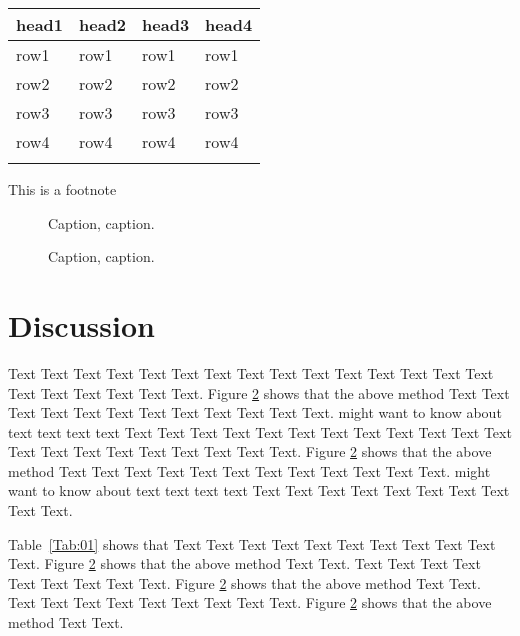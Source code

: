 \documentclass{bioinfo}
\begin{document}
\begin{methods}
\begin{table}[!t]
{\begin{tabular}{llll}\toprule
head1 & head2 & head3 & head4\\\midrule
row1 & row1 & row1 & row1\\
row2 & row2 & row2 & row2\\
row3 & row3 & row3 & row3\\
row4 & row4 & row4 & row4\\\botrule
\end{tabular}}{This is a footnote}
\end{table}

\end{methods}

\begin{figure}[!tpb]%
\caption{Caption, caption.}\label{fig:01}
\end{figure}

\begin{figure}[!tpb]%
\caption{Caption, caption.}\label{fig:02}
\end{figure}

\section{Discussion}

Text Text Text Text Text Text  Text Text Text Text Text Text Text Text Text  Text Text Text Text Text Text. Figure \ref{fig:02} shows that the above method  Text Text Text Text  Text Text Text Text Text Text  Text Text.  \citealp{Boffelli03} might want to know about  text text text text
Text Text Text Text Text Text  Text Text Text Text Text Text Text Text Text  Text Text Text Text Text Text. Figure \ref{fig:02} shows that the above method  Text Text Text Text  Text Text Text Text Text Text  Text Text.  \citealp{Boffelli03} might want to know about  text text text text
Text Text Text Text Text Text  Text Text Text Text.




Table~\ref{Tab:01} shows that Text Text Text Text Text  Text Text Text Text Text Text. Figure \ref{fig:02} shows that
the above method Text Text. Text Text Text  Text Text Text Text Text Text. Figure \ref{fig:02} shows that
the above method Text Text. Text Text Text  Text Text Text Text Text Text. Figure \ref{fig:02} shows that
the above method Text Text.
\end{document}
